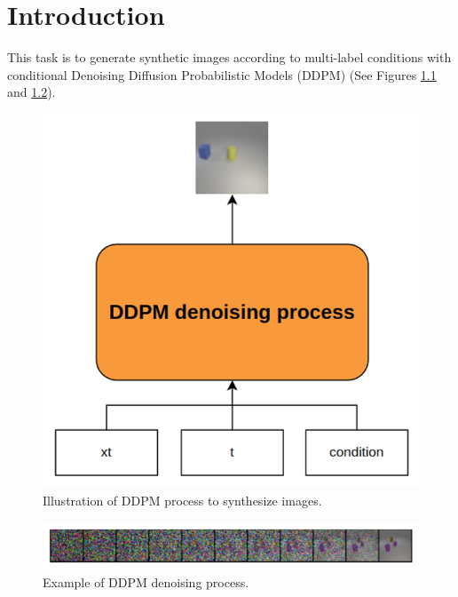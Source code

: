 \chapter{Introduction}
\indent
	This task is to generate synthetic images according to multi-label conditions with
	conditional Denoising Diffusion Probabilistic Models (DDPM) (See Figures \ref{ddpm-arch} and \ref{ddpm-example}).

	\begin{figure}[H]
		\centering
		\includegraphics[scale=0.7]{img/ddpm_arch.png}
		\caption{Illustration of DDPM process to synthesize images.}
		\label{ddpm-arch}
	\end{figure}

	\begin{figure}[H]
		\centering
		\includegraphics[width=\textwidth]{img/ddpm_example.png}
		\caption{Example of DDPM denoising process.}
		\label{ddpm-example}
	\end{figure}